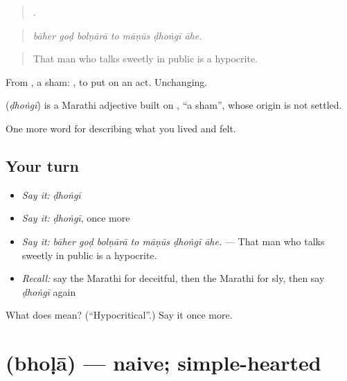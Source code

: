 \begin{quote}
      .
\end{quote}

\begin{quote}
\emph{bāher goḍ bolṇārā to māṇūs ḍhoṅgī āhe.}
\end{quote}

\begin{quote}
That man who talks sweetly in public is a hypocrite.
\end{quote}

From , a sham:  , to put on an act. Unchanging.

\begin{cousinweb}
\textbf{} (\emph{ḍhoṅgī}) is a Marathi adjective built on , \textquotedblleft{}a sham\textquotedblright{}, whose origin is not settled.
\end{cousinweb}

\begin{grammarlens}[title={What you've built}]
One more word for describing what you lived and felt.
\end{grammarlens}

\subsection*{Your turn}
\begin{itemize}
\raggedright
  \item \emph{Say it:} \emph{ḍhoṅgī}
  \item \emph{Say it:} \emph{ḍhoṅgī}, once more
  \item \emph{Say it:} \emph{bāher goḍ bolṇārā to māṇūs ḍhoṅgī āhe.} — That man who talks sweetly in public is a hypocrite.
  \item \emph{Recall:} say the Marathi for deceitful, then the Marathi for sly, then say \emph{ḍhoṅgī} again
\end{itemize}

\begin{tcolorbox}[breakable,colback=teal!4,colframe=teal!35!black,title={Before you move on}]
What does  mean? (\textquotedblleft{}Hypocritical\textquotedblright{}.) Say it once more.
\end{tcolorbox}
\section[\texorpdfstring{\mr{भोळा} (bhoḷā)}{भोळा (bhoḷā)}]{ (bhoḷā) — naive; simple-hearted}

